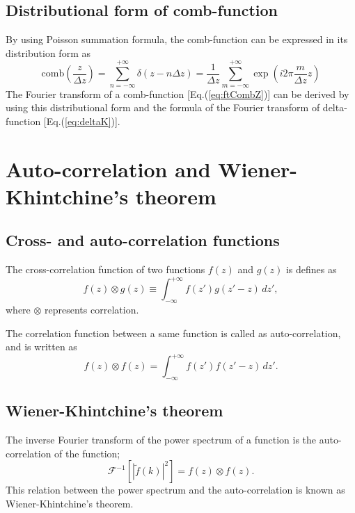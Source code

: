 \documentclass[a4paper]{article}
\newcommand{\iftf}[1]{{\mathcal{F}^{-1}\left[#1\right]\xspace}}
\newcommand{\ftt}[1]{{\tilde{#1}\xspace}}
\newcommand{\comb}[1]{{\mathrm{comb}\left( #1 \right)}\xspace}
\newcommand{\Dz}{{\Delta z}\xspace}
\begin{document}
\subsection{Distributional form of comb-function}
By using Poisson summation formula, the comb-function can be expressed in its distribution form as
\begin{equation}
	\comb{\frac{z}{\Dz}} 
	= \sum_{n = -\infty}^{+\infty} \delta\left( z-n\Dz \right)
	= \frac{1}{\Dz} \sum_{m=-\infty}^{+\infty} \exp\left(i2\pi \frac{m}{\Dz} z\right)
\end{equation}
The Fourier transform of a comb-function [Eq.\@ (\ref{eq:ftCombZ})] can be derived by using this distributional form and the formula of the Fourier transform of delta-function [Eq.\@ (\ref{eq:deltaK})].

\section{Auto-correlation and Wiener-Khintchine’s theorem}
\subsection{Cross- and auto-correlation functions}
The cross-correlation function of two functions $f(z)$ and $g(z)$ is defines as
\begin{equation}
	f(z) \otimes g(z) \equiv \int_{-\infty}^{+\infty} f(z') g(z'-z)\, dz',
\end{equation}
where $\otimes$ represents correlation.

The correlation function between a same function is called as auto-correlation, and is written as
\begin{equation}
	f(z) \otimes f(z)  = \int_{-\infty}^{+\infty} f(z') f(z'-z)\, dz'.
\end{equation}


\subsection{Wiener-Khintchine’s theorem}
The inverse Fourier transform of the power spectrum of a function is the auto-correlation of the function;
\begin{equation}
	\iftf{ \left|\ftt{f}(k)\right|^2} = f(z) \otimes f(z).
\end{equation}
This relation between the power spectrum and the auto-correlation is known as Wiener-Khintchine’s theorem.
\end{document}
